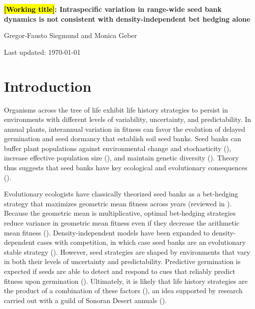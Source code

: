 \documentclass[12pt, oneside, titlepage]{article}   	%
\begin{document}
\begin{titlepage}
   \begin{center}
       \vspace*{1cm}
 
       \textbf{\hl{[Working title]}: Intraspecific variation in range-wide seed bank dynamics is not consistent with density-independent bet hedging alone}
 
       \vspace{1.5cm}
 
       Gregor-Fausto Siegmund and Monica Geber
 
   	Last updated: \today
	

	
 
   \end{center}
\end{titlepage}
%

\section{Introduction}

Organisms across the tree of life exhibit life history strategies to persist in environments with different levels of variability, uncertainty, and predictability. In annual plants, interannual variation in fitness can favor the evolution of delayed germination and seed dormancy that establish soil seed banks. Seed banks can buffer plant populations against environmental change and stochasticity (\cite{eager2014,paniw2017}), increase effective population size (\cite{nunney2002,waples2006}), and maintain genetic diversity (\cite{mccue1998b}). Theory thus suggests that seed banks have key ecological and evolutionary consequences (\cite{evans2005}). 

Evolutionary ecologists have classically theorized seed banks as a bet-hedging strategy that maximizes geometric mean fitness across years (reviewed in \cite{philippi1989,simons2011}). Because the geometric mean is multiplicative, optimal bet-hedging strategies reduce variance in geometric mean fitness even if they decrease the arithmetic mean fitness (\cite{cohen1966}). Density-independent models have been expanded to density-dependent cases with competition, in which case seed banks are an evolutionary stable strategy (\cite{ellner1985,ellner1985a}). However, seed strategies are shaped by environments that vary in both their levels of uncertainty and predictability. Predictive germination is expected if seeds are able to detect and respond to cues that reliably predict fitness upon germination (\cite{cohen1967}). Ultimately, it is likely that life history strategies are the product of a combination of these factors (\cite{simons2011}), an idea supported by research carried out with a guild of Sonoran Desert annuals (\cite{venable2007,gremer2014,gremer2016}).
\end{document}
